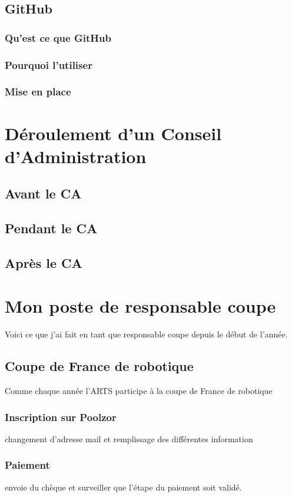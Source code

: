 \documentclass[12pt,a4paper]{report}
\begin{document}
    \subsection{GitHub}
      \subsubsection{Qu'est ce que GitHub}
      \subsubsection{Pourquoi l'utiliser}
      \subsubsection{Mise en place}

  \section{Déroulement d'un Conseil d'Administration}
    \subsection{Avant le CA}
    \subsection{Pendant le CA}
    \subsection{Après le CA}

  \section{Mon poste de responsable coupe}
    Voici ce que j'ai fait en tant que responsable coupe depuis le début de l'année.
    \subsection{Coupe de France de robotique}
      Comme chaque année l'ARTS participe à la coupe de France de robotique
      \subsubsection{Inscription sur Poolzor}
        changement d'adresse mail
        et remplissage des différentes information
      \subsubsection{Paiement}
        envoie du chèque et surveiller que l'étape du paiement soit validé.
\end{document}
